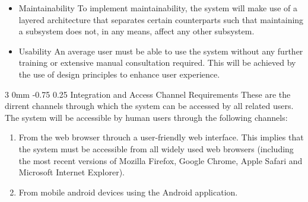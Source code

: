 \documentclass[12pt]{article}
\makeatletter
\renewcommand{\subsubsection}{\@startsection
   {subsubsection}%
   {3}%
   {0mm}%
   {-0.75\baselineskip}%
   {0.25\baselineskip}%
   {\rmfamily\normalfont\slshape\normalsize}}%
\makeatother
\begin{document}
\begin{itemize}
                							\item Maintainability
                									To implement maintainability, the system will make use of a layered architecture that separates certain counterparts such that maintaining a subsystem does not, in any means, affect any other subsystem.
		              								
                							\item Usability
                									An average user must be able to use the system without any further training or extensive manual consultation required. This will be achieved by the use of design principles to enhance user experience.
		               								
                							
                					\end{itemize} 
                			 
                			\subsubsection{Integration and Access Channel Requirements}
                					These are the dirrent channels through which the system can be accessed by all related users.
	                				The system will be accessible by human users through the following channels:
	                				
			                    	\begin{enumerate}
					                    	\item From the web browser throuch a user-friendly web interface. This implies that the system must be accessible from all widely used web browsers (including the most recent versions of Mozilla Firefox, Google Chrome, Apple Safari and Microsoft Internet Explorer).
					                    	\item From mobile android devices using the Android application.
			                    	\end{enumerate}  
			                    	  
\end{document}
